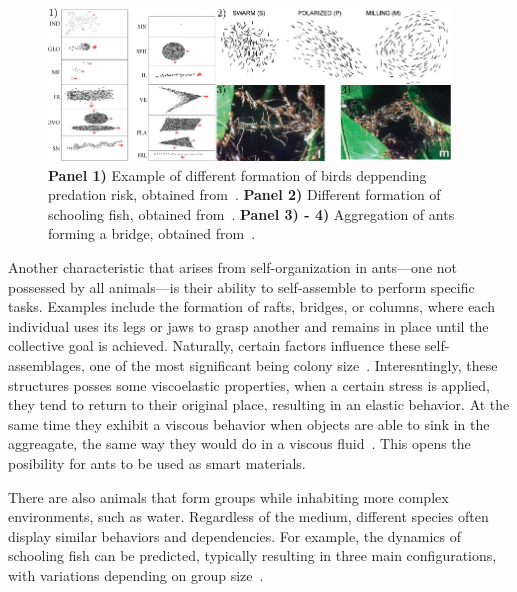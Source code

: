 \begin{figure}
  \begin{center}
    \includegraphics[width=0.95\textwidth]{figures/macroscopicagents.pdf}
  \end{center}
  \caption[Macroscopic Agents example]{\textbf{Panel 1)} Example of different formation of birds deppending predation risk, obtained from~\cite{carere2009aerial}. \textbf{Panel 2)} Different formation of schooling fish, obtained from~\cite{tunstrom2013collective}. \textbf{Panel 3) - 4)} Aggregation of ants forming a bridge, obtained from~\cite{anderson2002self}.}\label{fig:macroscopicagents}
\end{figure}


Another characteristic that arises from self-organization in ants—one not possessed by all animals—is their ability to self-assemble to perform specific tasks. Examples include the formation of rafts, bridges, or columns, where each individual uses its legs or jaws to grasp another and remains in place until the collective goal is achieved. Naturally, certain factors influence these self-assemblages, one of the most significant being colony size~\cite{anderson2002self}. Interesntingly, these structures posses some viscoelastic properties, when a certain stress is applied, they tend to return to their original place, resulting in an elastic behavior. At the same time they exhibit a viscous behavior when objects are able to sink in the aggreagate, the same way they would do in a viscous fluid~\cite{tennenbaum2016mechanics}. This opens the posibility for ants to be used as smart materials. 

There are also animals that form groups while inhabiting more complex environments, such as water. Regardless of the medium, different species often display similar behaviors and dependencies. For example, the dynamics of schooling fish can be predicted, typically resulting in three main configurations, with variations depending on group size~\cite{tunstrom2013collective, katz2011inferring, huang2024collective}.

